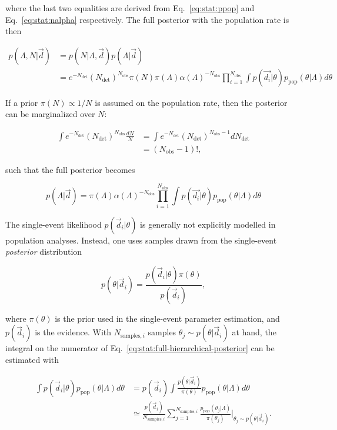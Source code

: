\documentclass[%
preprint,
nofootinbib,
 amsmath,amssymb,
 aps,
]{revtex4-2}
\newcommand{\given}[2]{p( #1 | #2 )}
\newcommand{\ppop}[0]{p_{\text{pop}}}
\newcommand{\ndet}[0]{N_{\text{det}}}
\newcommand{\nobs}[0]{N_{\text{obs}}}
\begin{document}
where the last two equalities are derived from Eq.~\eqref{eq:stat:ppop} and
Eq.~\eqref{eq:stat:nalpha} respectively. The full posterior with the population rate is then

\begin{align}
	\nonumber
	\given{\Lambda, N }{\vec{d}} & = \given{N}{\Lambda, \vec{d}}\given{\Lambda}{\vec{d}}                    \\
	                             & = e^{-\ndet}(\ndet)^{\nobs} \pi(N) \pi(\Lambda) \alpha(\Lambda)^{-\nobs}
	\prod_{i=1}^{\nobs} \int \given{\vec{d_i}}{\theta} \ppop(\theta | \Lambda ) d\theta
\end{align}

If a prior $\pi(N) \propto 1/N$ is assumed on the population rate, then the posterior can be
marginalized over $N$:

\begin{align}
	\int e^{-\ndet}(\ndet)^{\nobs} \frac{dN}{N} & = \int e^{-\ndet}(\ndet)^{\nobs - 1} d\ndet \\
	                                            & = (\nobs - 1)!,
\end{align}

such that the full posterior becomes

\begin{equation}
	\label{eq:stat:full-hierarchical-posterior}
	\given{\Lambda}{\vec{d}} = \pi(\Lambda) \alpha(\Lambda)^{-\nobs}
	\prod_{i=1}^{\nobs} \int \given{\vec{d_i}}{\theta} \ppop(\theta | \Lambda ) d\theta
\end{equation}

The single-event likelihood $\given{\vec{d}_i}{\theta}$ is generally not explicitly modelled in
population analyses. Instead, one uses samples drawn from the single-event \textit{posterior}
distribution

\begin{equation}
	\given{\theta}{\vec{d}_i} = \frac{\given{\vec{d}_i}{\theta} \pi(\theta)}{p(\vec{d}_i)},
\end{equation}

where $\pi(\theta)$ is the prior used in the single-event parameter estimation, and $p(\vec{d}_i)$
is the evidence. With $N_{\text{samples},i}$ samples $\theta_j \sim \given{\theta}{\vec{d}_i}$ at
hand, the integral on the numerator of Eq.~\eqref{eq:stat:full-hierarchical-posterior} can be
estimated with

\begin{align}
	\label{eq:stat:posterior-with-single-event-posterior-prior}
	\int \given{\vec{d}_i}{\theta} \ppop(\theta | \Lambda ) d\theta & = p(\vec{d}_i)\int \frac{\given{\theta}{\vec{d}_i}}{\pi(\theta)} \ppop(\theta | \Lambda ) d\theta                                                                                     \\
	\label{eq:stat:posterior-monte-carlo-sum}
	                                                                & \simeq \frac{p(\vec{d}_i)}{N_{\text{samples},i}} \sum_{j=1}^{N_{\text{samples},i}} \frac{\ppop(\theta_j | \Lambda )}{\pi(\theta_j)} \Big |_{\theta_j \sim \given{\theta}{\vec{d}_i}}.
\end{align}
\end{document}
